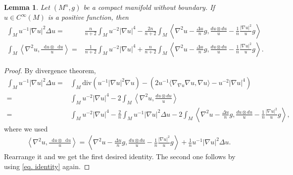 \documentclass[11pt]{amsart}
\newtheorem{lemma}{Lemma}
\numberwithin{equation}{section}
\numberwithin{lemma}{section}
\numberwithin{proposition}{section}
\numberwithin{corollary}{section}
\numberwithin{remark}{section}
\newcommand{\dd}{\mathop{}\!\mathrm{d}}%
\begin{document}
    
    \begin{lemma}\label{lem. integral identity}
        Let $(M^n,g)$ be a compact manifold without boundary. If $u\in C^{\infty}(M)$ is a positive function, then
        \begin{align*}
            \int_M u^{-1}|\nabla u|^2\Delta u
            =&\frac{n}{n+2}\int_M u^{-2}|\nabla u|^4
            -\frac{2n}{n+2}\int_M 
            \left\langle\nabla^2 u-\frac{\Delta u}{n}g,\frac{du\otimes du}{u}-\frac{1}{n}\frac{|\nabla u|^2}{u}g\right\rangle\\
            \int_M \left\langle
            \nabla^2u,\frac{\dd u\otimes \dd u}{u}
            \right\rangle
            =&\frac{1}{n+2}\int_M u^{-2}|\nabla u|^4
            +\frac{n}{n+2}\int_M \left\langle\nabla^2 u-\frac{\Delta u}{n}g,\frac{du\otimes du}{u}-\frac{1}{n}\frac{|\nabla u|^2}{u}g\right\rangle.
        \end{align*}
    \end{lemma}
    \begin{proof}
       By divergence theorem,
        \begin{align*}
            \int_M u^{-1}|\nabla u|^2\Delta u
            =&\int_M\mathrm{div}(u^{-1}|\nabla u|^2\nabla u)-(2u^{-1}\langle\nabla_{\nabla u}\nabla u,\nabla u\rangle-u^{-2}|\nabla u|^4)\\
            =&\int_M u^{-2}|\nabla u|^4
            -2\int_M 
            \left\langle
            \nabla ^2u
            ,\frac{du\otimes du}{u}
            \right\rangle\\
            =&\int_M u^{-2}|\nabla u|^4
            -\frac{2}{n}\int_M u^{-1}|\nabla u|^2\Delta u
            -2\int_M\left\langle
            \nabla ^2u-\frac{\Delta u}{n}g
            ,\frac{du\otimes du}{u}-\frac{1}{n}\frac{|\nabla u|^2}{u}g
            \right\rangle,
        \end{align*}
        where we used
        \begin{align}\label{eq. identity}
            \left\langle
            \nabla^2u,\frac{\dd u\otimes \dd u}{u}
            \right\rangle
            =\left\langle
            \nabla ^2u-\frac{\Delta u}{n}g
            ,\frac{du\otimes du}{u}-\frac{1}{n}\frac{|\nabla u|^2}{u}g
            \right\rangle
            +\frac{1}{n}u^{-1}|\nabla u|^2\Delta u.
        \end{align}
        Rearrange it and we get the first desired identity. The second one follows by using \cref{eq. identity} again.
    \end{proof}
\end{document}
